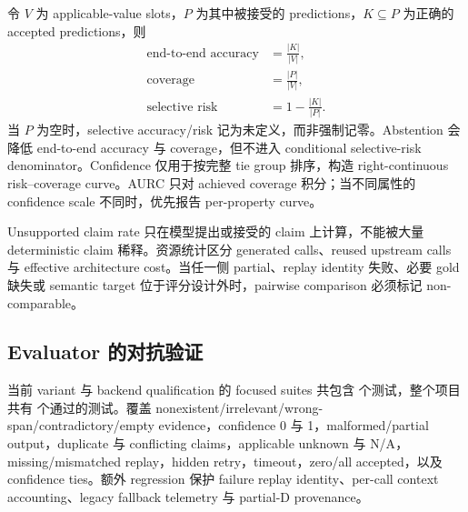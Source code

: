 \documentclass[UTF8,fontset=fandol,11pt]{ctexart}
\newcommand{\NA}{\textsf{N/A}}
\begin{document}
令 $V$ 为 applicable-value slots，$P$ 为其中被接受的 predictions，$K\subseteq P$ 为正确的 accepted predictions，则
\begin{align}
  \text{end-to-end accuracy} &= \frac{\lvert K\rvert}{\lvert V\rvert},\\
  \text{coverage} &= \frac{\lvert P\rvert}{\lvert V\rvert},\\
  \text{selective risk} &= 1-\frac{\lvert K\rvert}{\lvert P\rvert}.
\end{align}
当 $P$ 为空时，selective accuracy/risk 记为未定义，而非强制记零。Abstention 会降低 end-to-end accuracy 与 coverage，但不进入 conditional selective-risk denominator。Confidence 仅用于按完整 tie group 排序，构造 right-continuous risk--coverage curve。AURC 只对 achieved coverage 积分；当不同属性的 confidence scale 不同时，优先报告 per-property curve。

Unsupported claim rate 只在模型提出或接受的 claim 上计算，不能被大量 deterministic claim 稀释。资源统计区分 generated calls、reused upstream calls 与 effective architecture cost。当任一侧 partial、replay identity 失败、必要 gold 缺失或 semantic target 位于评分设计外时，pairwise comparison 必须标记 non-comparable。

\subsection{Evaluator 的对抗验证}

当前 variant 与 backend qualification 的 focused suites 共包含 \FocusedTests{} 个测试，整个项目共有 \FullTests{} 个通过的测试。覆盖 nonexistent/irrelevant/wrong-span/contradictory/empty evidence，confidence 0 与 1，malformed/partial output，duplicate 与 conflicting claims，applicable unknown 与 \NA，missing/mismatched replay，hidden retry，timeout，zero/all accepted，以及 confidence ties。额外 regression 保护 failure replay identity、per-call context accounting、legacy fallback telemetry 与 partial-D provenance。
\end{document}
